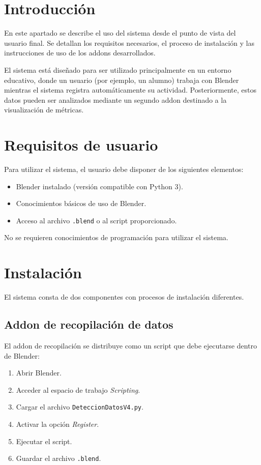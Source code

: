 
\section{Introducción}

En este apartado se describe el uso del sistema desde el punto de vista del usuario final. Se detallan los requisitos necesarios, el proceso de instalación y las instrucciones de uso de los addons desarrollados.

El sistema está diseñado para ser utilizado principalmente en un entorno educativo, donde un usuario (por ejemplo, un alumno) trabaja con Blender mientras el sistema registra automáticamente su actividad. Posteriormente, estos datos pueden ser analizados mediante un segundo addon destinado a la visualización de métricas.

\section{Requisitos de usuario}

Para utilizar el sistema, el usuario debe disponer de los siguientes elementos:

\begin{itemize}
    \item Blender instalado (versión compatible con Python 3).
    \item Conocimientos básicos de uso de Blender.
    \item Acceso al archivo \texttt{.blend} o al script proporcionado.
\end{itemize}

No se requieren conocimientos de programación para utilizar el sistema.

\section{Instalación}

El sistema consta de dos componentes con procesos de instalación diferentes.

\subsection{Addon de recopilación de datos}

El addon de recopilación se distribuye como un script que debe ejecutarse dentro de Blender:

\begin{enumerate}
    \item Abrir Blender.
    \item Acceder al espacio de trabajo \textit{Scripting}.
    \item Cargar el archivo \texttt{DeteccionDatosV4.py}.
    \item Activar la opción \textit{Register}.
    \item Ejecutar el script.
    \item Guardar el archivo \texttt{.blend}.
\end{enumerate}

